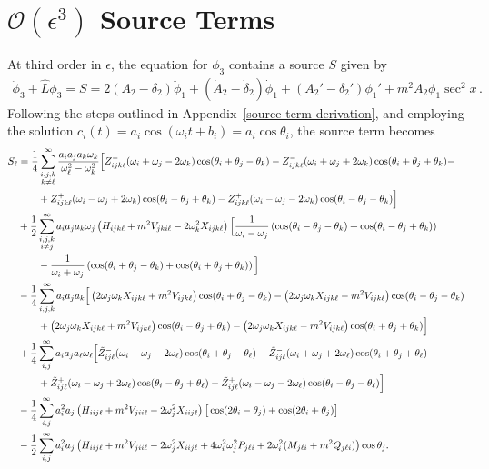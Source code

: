 \documentclass[letterpaper,11pt]{article}
\newcommand{\oi}{\omega_i}
\newcommand{\oj}{\omega_j}
\newcommand{\ok}{\omega_k}
\newcommand{\ol}{\omega_\ell}
\newcommand{\thi}{\theta_i}
\newcommand{\thj}{\theta_j}
\newcommand{\thk}{\theta_k}
\newcommand{\thl}{\theta_\ell}
\newcommand{\mc}{\mathcal}
\begin{document}
\section{$\mc O(\epsilon^3)$ Source Terms}
At third order in $\epsilon$, the equation for $\phi_3$ contains a source $S$ given by
\begin{align}
\ddot \phi_3 + \hat L \phi_3 = S = 2 (A_2 - \delta_2) \ddot \phi_1 + (\dot A_2 - \dot \delta_2) \dot\phi_1 + (A_2' -\delta_2' )\phi_1' + m^2 A_2 \phi_1 \sec^2 x \, .
\end{align}
Following the steps outlined in Appendix~\ref{source term derivation}, and employing the solution $c_i(t) = a_i \cos (\oi t + b_i) = a_i \cos \theta_i$, the source term becomes
\begin{align}
\label{general source}
S_\ell &=\frac{1}{4} \sum_{\substack{i,j,k \\ k \neq \ell}}^\infty \frac{a_i a_j a_k \ok}{\ol^2 - \ok^2} \Big[ Z^-_{ijk\ell} (\oi + \oj - 2\ok) \cos (\thi + \thj - \thk) - Z^-_{ijk\ell} (\oi + \oj + 2\ok) \cos (\thi + \thj + \thk) - \nonumber \\
%
&\qquad + Z^+_{ijk\ell} (\oi - \oj + 2\ok)  \cos(\thi - \thj + \thk) - Z^+_{ijk\ell} (\oi - \oj - 2\ok) \cos (\thi - \thj - \thk) \Big] \nonumber \\
%
& + \frac{1}{2}\sum_{\substack{i,j,k \\ i \neq j}}^\infty a_i a_j a_k \oj \left( H_{ijk\ell} + m^2 V_{jki\ell} - 2\ok^2 X_{ijk\ell} \right) \Big[ \frac{1}{\oi - \oj} \left( \cos (\thi - \thj - \thk)  + \cos(\thi - \thj + \thk) \right) \nonumber \\
%
& \qquad - \frac{1}{\oi + \oj} \left( \cos (\thi + \thj - \thk)  + \cos ( \thi + \thj + \thk) \right) \Big] \nonumber \\
%
& - \frac{1}{4} \sum_{i,j,k}^\infty a_i a_j a_k \Big[ \left( 2\oj \ok X_{ijk\ell} + m^2 V_{ijk\ell} \right)\cos(\thi + \thj - \thk) -  \left( 2\oj\ok X_{ijk\ell} - m^2 V_{ijk\ell} \right) \cos(\thi - \thj - \thk) \nonumber \\
%
& \qquad + \left(2\oj \ok X_{ijk\ell} + m^2 V_{ijk\ell} \right) \cos (\thi - \thj + \thk) - \left( 2\oj\ok X_{ijk\ell} - m^2 V_{ijk\ell} \right) \cos(\thi + \thj + \thk) \Big] \nonumber \\
%
& + \frac{1}{4} \sum_{i,j}^\infty a_i a_j a_\ell \ol \Big[ \tilde Z^-_{ij\ell} (\oi + \oj - 2\ol) \cos (\thi + \thj - \thl) - \tilde Z^-_{ij\ell} (\oi + \oj + 2\ol) \cos(\thi + \thj +  \thl) \nonumber \\
%
& \qquad + \tilde Z^+_{ij\ell} (\oi - \oj + 2\ol) \cos(\thi - \thj + \thl)  - \tilde Z^+_{ij\ell} (\oi - \oj - 2\ol) \cos( \thi - \thj - \thl)  \Big] \nonumber \\
%
& - \frac{1}{4} \sum_{i,j}^\infty a_i^2 a_j \left( H_{iij\ell} + m^2 V_{jii\ell} - 2\oj^2 X_{iij\ell} \right) \big[ \cos (2\thi - \thj) + \cos (2\thi + \thj) \big] \nonumber \\
%
& - \frac{1}{2} \sum_{i,j}^\infty a_i^2 a_j \left( H_{iij\ell} + m^2 V_{jii\ell} - 2\oj^2 X_{iij\ell} + 4\oi^2 \oj^2 P_{j\ell i} + 2\oi^2 (M_{j\ell i} + m^2 Q_{j\ell i}) \right) \cos \thj . \hspace{-0.2in}
\end{align} 
\end{document}
